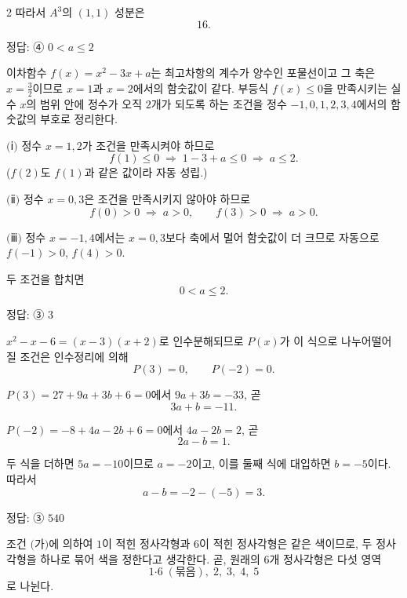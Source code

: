 \documentclass[10pt]{article}
\begin{document}
\begin{multicols}{2}
따라서 $A^3$의 $(1, 1)$ 성분은
\[ 16. \]

\begin{answerbox}정답: ④ $0 < a \le 2$\end{answerbox}

이차함수 $f(x) = x^2 - 3x + a$는 최고차항의 계수가 양수인 포물선이고 그 축은 $x = \tfrac{3}{2}$이므로 $x = 1$과 $x = 2$에서의 함숫값이 같다. 부등식 $f(x) \le 0$을 만족시키는 실수 $x$의 범위 안에 정수가 오직 $2$개가 되도록 하는 조건을 정수 $-1, 0, 1, 2, 3, 4$에서의 함숫값의 부호로 정리한다.

$(\!$ⅰ$)$ 정수 $x = 1, 2$가 조건을 만족시켜야 하므로
\[ f(1) \le 0 \;\Rightarrow\; 1 - 3 + a \le 0 \;\Rightarrow\; a \le 2. \]
($f(2)$도 $f(1)$과 같은 값이라 자동 성립.)

$(\!$ⅱ$)$ 정수 $x = 0, 3$은 조건을 만족시키지 않아야 하므로
\[ f(0) > 0 \;\Rightarrow\; a > 0, \qquad f(3) > 0 \;\Rightarrow\; a > 0. \]

$(\!$ⅲ$)$ 정수 $x = -1, 4$에서는 $x = 0, 3$보다 축에서 멀어 함숫값이 더 크므로 자동으로 $f(-1) > 0$, $f(4) > 0$.

두 조건을 합치면
\[ 0 < a \le 2. \]

\begin{answerbox}정답: ③ $3$\end{answerbox}

$x^2 - x - 6 = (x - 3)(x + 2)$로 인수분해되므로 $P(x)$가 이 식으로 나누어떨어질 조건은 인수정리에 의해
\[ P(3) = 0,\qquad P(-2) = 0. \]

$P(3) = 27 + 9a + 3b + 6 = 0$에서 $9a + 3b = -33$, 곧
\[ 3a + b = -11. \]

$P(-2) = -8 + 4a - 2b + 6 = 0$에서 $4a - 2b = 2$, 곧
\[ 2a - b = 1. \]

두 식을 더하면 $5a = -10$이므로 $a = -2$이고, 이를 둘째 식에 대입하면 $b = -5$이다. 따라서
\[ a - b = -2 - (-5) = 3. \]

\begin{answerbox}정답: ③ $540$\end{answerbox}

조건 $(\!$가$)$에 의하여 $1$이 적힌 정사각형과 $6$이 적힌 정사각형은 같은 색이므로, 두 정사각형을 하나로 묶어 색을 정한다고 생각한다. 곧, 원래의 $6$개 정사각형은 다섯 영역
\[ 1\text{·}6\;(\text{묶음}),\; 2,\; 3,\; 4,\; 5 \]
로 나뉜다.


\end{multicols}
\end{document}
